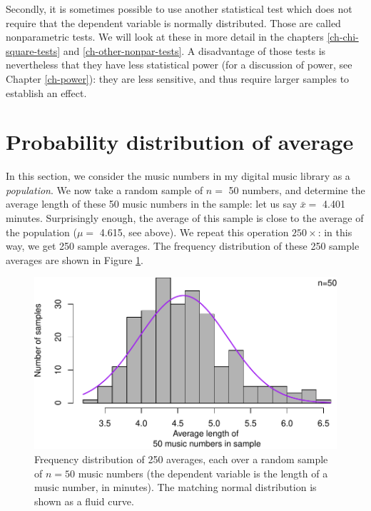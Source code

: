 \documentclass[
]{book}
\begin{document}
Secondly, it is sometimes possible to use another statistical test which does
not require that the dependent variable is normally distributed. Those are called
nonparametric tests. We will look at these in more detail in the chapters
\ref{ch-chi-square-tests} and
\ref{ch-other-nonpar-tests}.
A disadvantage of those tests is nevertheless that they have less
statistical power (for a discussion of power,
see Chapter \ref{ch-power}): they are less sensitive, and thus require larger
samples to establish an effect.

\hypertarget{sec:CentralLimitTheorem}{%
\section{Probability distribution of average}\label{sec:CentralLimitTheorem}}

In this section, we consider the music numbers in my digital
music library as a \emph{population}. We now take a random
sample of \(n=\) 50 numbers, and determine the average length of these
50 music numbers in the sample:
let us say \(\bar{x} =\) 4.401 minutes. Surprisingly
enough, the average of this sample is close to the average
of the population (\(\mu =\) 4.615, see above).
We repeat this operation
\(250\times\): in this way, we get 250 sample averages. The
frequency distribution of these 250 sample averages are shown in
Figure \ref{fig:itunesmeanshist}.

\begin{figure}
\centering
\includegraphics{QMS-EN_files/figure-latex/itunesmeanshist-1.pdf}
\caption{\label{fig:itunesmeanshist}Frequency distribution of 250 averages, each over a random sample of \(n=50\) music numbers (the dependent variable is the length of a music number, in minutes). The matching normal distribution is shown as a fluid curve.}
\end{figure}
\end{document}
